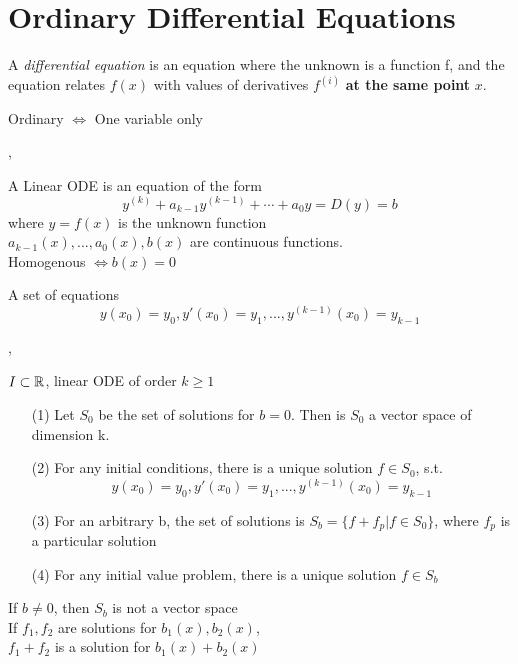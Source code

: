 \part{Ordinary Differential Equations}
\setcounter{section}{0}

\Def A \textit{differential equation} is an equation where the unknown is a function f, and the equation relates $f(x)$ with values of derivatives $f^{(i)}$ \textbf{at the same point} $x$.

\Def Ordinary $\iff$ One variable only

\sep

\Def A Linear ODE is an equation of the form
\[ y^{(k)} + a_{k - 1} y^{(k - 1)} + \cdots + a_0 y = D(y) = b \] 
where $y = f(x)$ is the unknown function \\
$a_{k - 1}(x), ..., a_0(x), b(x)$ are continuous functions. \\

\Def Homogenous $ \iff b(x) = 0$ 

 A set of equations
\[y(x_0) = y_0, y'(x_0) = y_1, ..., y^{(k - 1)}(x_0) = y_{k - 1} \]

\sep

\Theorem[2.2.3] $I \subset \mathbb{R}$,  linear ODE of order $k \geq 1$
\begin{enumerate}
\item[(1)] Let $S_0$ be the set of solutions for $b = 0$. Then is $S_0$ a vector space of dimension k.
\item[(2)] For any initial conditions, there is a unique solution $f \in S_0$, s.t.
\[y(x_0) = y_0, y'(x_0) = y_1, ..., y^{(k - 1)}(x_0) = y_{k - 1} \]

\item[(3)] For an arbitrary b, the set of solutions is $S_b = \{f + f_p | f \in S_0\}$, where $f_p$ is a particular solution
\item[(4)] For any initial value problem, there is a unique solution $f \in S_b$
\end{enumerate}
\Bem If $b \neq 0$, then $S_b$ is not a vector space \\
\Bem If $f_1, f_2$ are solutions for $b_1(x), b_2(x)$, \\ $f_1 + f_2$ is a solution for $b_1(x) + b_2(x)$




